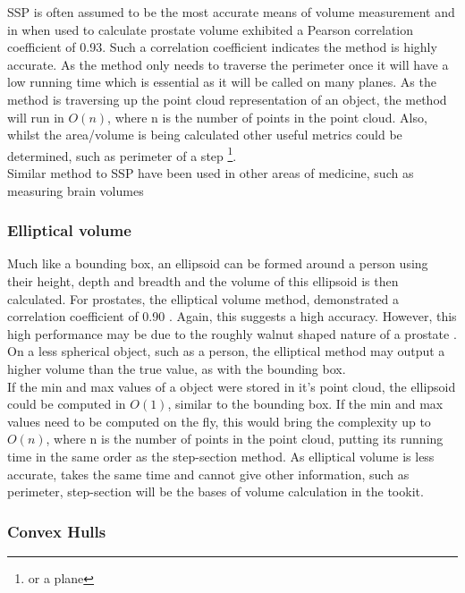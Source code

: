 SSP is often assumed to be the most accurate means of volume measurement and in when used to calculate prostate volume \cite{K1991} exhibited a Pearson correlation coefficient of 0.93. 
Such a correlation coefficient indicates the method is highly accurate.
As the method only needs to traverse the perimeter once it will have a low running time which is essential as it will be called on many planes. As the method is traversing up the point cloud representation of an object, the method will run in $O(n)$, where n is the number of points in the point cloud. Also, whilst the area/volume is being calculated other useful metrics could be determined, such as perimeter of a step \footnote{or a plane}.\\

Similar method to SSP have been used in other areas of medicine, such as measuring brain volumes \cite{Rosen1990}

\subsubsection{Elliptical volume}
Much like a bounding box, an ellipsoid can be formed around a person using their height, depth and breadth and the volume of this ellipsoid is then calculated.
For prostates, the elliptical volume method, demonstrated a correlation coefficient of 0.90 \cite{K1991}. Again, this suggests a high accuracy.
However, this high performance may be due to the roughly walnut shaped nature of a prostate . 
On a less spherical object, such as a person, the elliptical method may output a higher volume than the true value, as with the bounding box.\\

If the min and max values of a object were stored in it's point cloud, the ellipsoid could be computed in $O(1)$, similar to the bounding box. 
If the min and max values need to be computed on the fly, this would bring the complexity up to $O(n)$, where n is the number of points in the point cloud, putting its running time in the same order as the step-section method.
As elliptical volume is less accurate, takes the same time and cannot give other information, such as perimeter, step-section will be the bases of volume calculation in the tookit.

\subsubsection{Convex Hulls}